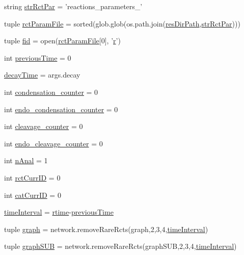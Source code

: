 \begin{DoxyCompactItemize}
\item 
string \hyperlink{a00117_af48af84bff2351a55727aba6a63c1b52}{str\-Rct\-Par} = 'reactions\-\_\-parameters\-\_\-'
\item 
tuple \hyperlink{a00117_ac4e9cba2fd0b813ba19029541ad609e5}{rct\-Param\-File} = sorted(glob.\-glob(os.\-path.\-join(\hyperlink{a00117_a93d7d68ada532b3cedaab103283ab91a}{res\-Dir\-Path},\hyperlink{a00117_af48af84bff2351a55727aba6a63c1b52}{str\-Rct\-Par})))
\item 
tuple \hyperlink{a00117_a68ab0ffa4b5ff1cceff01f4abe686ad0}{fid} = open(\hyperlink{a00117_ac4e9cba2fd0b813ba19029541ad609e5}{rct\-Param\-File}\mbox{[}0\mbox{]}, '\hyperlink{a00031_ac862e7284527eb913b1351c8bfb8e079}{r}')
\item 
int \hyperlink{a00117_a6a6de947e3b6ada5ea6e761d208228bd}{previous\-Time} = 0
\item 
\hyperlink{a00117_a5517c07ae046c271d6291e9b3f7d139d}{decay\-Time} = args.\-decay
\item 
int \hyperlink{a00117_a358b60986e7e25df0dfb61562b7aa3e2}{condensation\-\_\-counter} = 0
\item 
int \hyperlink{a00117_a0521d81d319c4d79433b5fb65a6da1c2}{endo\-\_\-condensation\-\_\-counter} = 0
\item 
int \hyperlink{a00117_aba28788973ae3e9140b53078efe5d204}{cleavage\-\_\-counter} = 0
\item 
int \hyperlink{a00117_a17b22b48a2afe0223186b4275fe5ba70}{endo\-\_\-cleavage\-\_\-counter} = 0
\item 
int \hyperlink{a00117_ae7ca1c378927da05feb71e5a9f775afb}{n\-Anal} = 1
\item 
int \hyperlink{a00117_a53e397dea15f17442a198395e65b377b}{rct\-Curr\-I\-D} = 0
\item 
int \hyperlink{a00117_aa56c55225fa65fa569bd8d5f1063550e}{cat\-Curr\-I\-D} = 0
\item 
\hyperlink{a00117_a5ba0cd0b7538ed8047b2fea322ecb4b7}{time\-Interval} = \hyperlink{a00028_afc6b38657a313b9f1de2ee356910b6ee}{rtime}-\/\hyperlink{a00117_a6a6de947e3b6ada5ea6e761d208228bd}{previous\-Time}
\item 
tuple \hyperlink{a00117_a4cfdc01ecc5ad260a4f30c9353e3d856}{graph} = network.\-remove\-Rare\-Rcts(graph,2,3,4,\hyperlink{a00117_a5ba0cd0b7538ed8047b2fea322ecb4b7}{time\-Interval})
\item 
tuple \hyperlink{a00117_ab96de87bc8cbe59221256af996bdc43e}{graph\-S\-U\-B} = network.\-remove\-Rare\-Rcts(graph\-S\-U\-B,2,3,4,\hyperlink{a00117_a5ba0cd0b7538ed8047b2fea322ecb4b7}{time\-Interval})

\end{DoxyCompactItemize}
